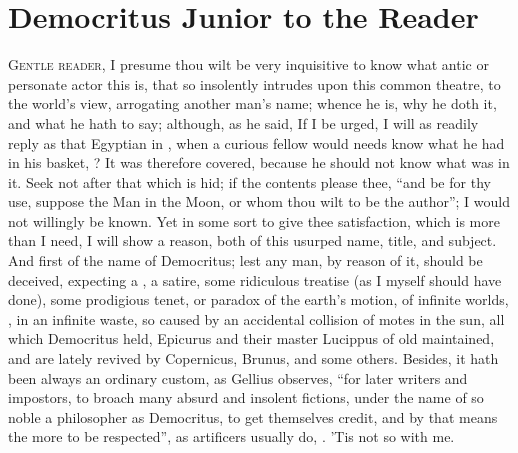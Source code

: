 \chapter{Democritus Junior to the Reader}
\lettrine[lines=4,findent=5pt,nindent=0pt]{G}{entle reader}, I presume thou
wilt be very inquisitive to know what antic or personate actor this is, that so
insolently intrudes upon this common theatre, to the world's view, arrogating
another man's name; whence he is, why he doth it, and what he hath to say;
although, as he said,  If I be urged, I will as readily reply as that Egyptian in
, when a curious fellow would needs know what he had
in his basket, ? It
was therefore covered, because he should not know what was in it. Seek not
after that which is hid; if the contents please thee, \enquote{and be
for thy use, suppose the Man in the Moon, or whom thou wilt to be the author};
I would not willingly be known. Yet in some sort to give thee satisfaction,
which is more than I need, I will show a reason, both of this usurped name,
title, and subject. And first of the name of Democritus; lest any man, by
reason of it, should be deceived, expecting a , a satire, some
ridiculous treatise (as I myself should have done), some prodigious tenet, or
paradox of the earth's motion, of infinite worlds, , in an infinite waste, so caused by an accidental
collision of motes in the sun, all which Democritus held, Epicurus and their
master Lucippus of old maintained, and are lately revived by Copernicus,
Brunus, and some others. Besides, it hath been always an ordinary custom, as
Gellius observes, \enquote{for later writers and impostors, to
broach many absurd and insolent fictions, under the name of so noble a
philosopher as Democritus, to get themselves credit, and by that means the more
to be respected}, as artificers usually do, . 'Tis not so with me.


